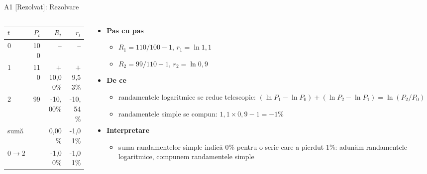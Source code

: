 \begin{frame}{A1 [Rezolvat]: Rezolvare}
\itemsize{\small}
\begin{columns}[T]
\begin{column}{0.42\textwidth}
\begin{center}
\footnotesize
\begin{tabular}{lrrr}
\toprule
$t$ & $P_t$ & $R_t$ & $r_t$ \\
\midrule
0 & 100 & -- & -- \\
1 & 110 & $+$10{,}00\% & $+$9{,}53\% \\
2 & 99 & -10{,}00\% & -10{,}54\% \\
\midrule sumă & & 0{,}00\% & -1{,}01\% \\
$0 \to 2$ & & -1{,}00\% & -1{,}01\% \\
\bottomrule
\end{tabular}
\end{center}

\end{column}
\begin{column}{0.55\textwidth}
\begin{itemize}
    \item \textbf{Pas cu pas}
    \begin{itemize}
        \item $R_1 = 110/100 - 1$, $r_1 = \ln 1{,}1$
        \item $R_2 = 99/110 - 1$, $r_2 = \ln 0{,}9$
    \end{itemize}
    \item \textbf{De ce}
    \begin{itemize}
        \item randamentele logaritmice se reduc telescopic: $(\ln P_1 - \ln P_0) + (\ln P_2 - \ln P_1) = \ln(P_2/P_0)$
        \item randamentele simple se compun: $1{,}1 \times 0{,}9 - 1 = -1\%$
    \end{itemize}
    \item \textbf{Interpretare}
    \begin{itemize}
        \item suma randamentelor simple indică 0\% pentru o serie care a pierdut 1\%: adunăm randamentele logaritmice, compunem randamentele simple
    \end{itemize}
\end{itemize}
\end{column}
\end{columns}
\end{frame}

